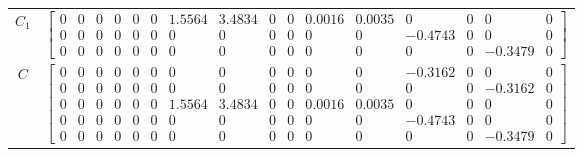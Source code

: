 \begin{tabular}{cl}
 $C_{1}$  & $\left[\begin{array}{cccccccccccccccc}0 & 0 & 0 & 0 & 0 & 0 & 1.5564 & 3.4834 & 0 & 0 & 0.0016 & 0.0035 & 0 & 0 & 0 & 0\\0 & 0 & 0 & 0 & 0 & 0 & 0 & 0 & 0 & 0 & 0 & 0 & -0.4743 & 0 & 0 & 0\\0 & 0 & 0 & 0 & 0 & 0 & 0 & 0 & 0 & 0 & 0 & 0 & 0 & 0 & -0.3479 & 0\end{array}\right]$                                                                                                                                                                                                                                                                                                                                                                                                                                                                                                                                                                                                                                                                                                                                                                                                                                                                                                                                                                                                                        \\
   $C$    & $\left[\begin{array}{cccccccccccccccc}0 & 0 & 0 & 0 & 0 & 0 & 0 & 0 & 0 & 0 & 0 & 0 & -0.3162 & 0 & 0 & 0\\0 & 0 & 0 & 0 & 0 & 0 & 0 & 0 & 0 & 0 & 0 & 0 & 0 & 0 & -0.3162 & 0\\0 & 0 & 0 & 0 & 0 & 0 & 1.5564 & 3.4834 & 0 & 0 & 0.0016 & 0.0035 & 0 & 0 & 0 & 0\\0 & 0 & 0 & 0 & 0 & 0 & 0 & 0 & 0 & 0 & 0 & 0 & -0.4743 & 0 & 0 & 0\\0 & 0 & 0 & 0 & 0 & 0 & 0 & 0 & 0 & 0 & 0 & 0 & 0 & 0 & -0.3479 & 0\end{array}\right]$                                                                                                                                                                                                                                                                                                                                                                                                                                                                                                                                                                                                                                                                                                                                                                                                                                                                              \\

\end{tabular}
